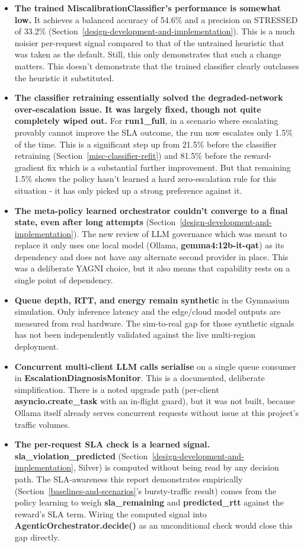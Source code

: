 \begin{itemize}
\item \textbf{The trained MiscalibrationClassifier's performance is somewhat
low.} It achieves a balanced accuracy of 54.6\% and a precision on
STRESSED of 33.2\% (Section~\ref{design-development-and-implementation}).
This is a much noisier per-request signal compared to that of the
untrained heuristic that was taken as the default. Still, this only
demonstrates that such a change matters. This doesn't demonstrate that
the trained classifier clearly outclasses the heuristic it
substituted.
\item \textbf{The classifier retraining essentially solved the
degraded-network over-escalation issue. It was largely fixed, though
not quite completely wiped out.} For \textbf{run1\_full}, in a
scenario where escalating provably cannot improve the SLA outcome,
the run now escalates only 1.5\% of the time. This is a significant
step up from 21.5\% before the classifier retraining
(Section~\ref{misc-classifier-refit}) and 81.5\% before the
reward-gradient fix which is a substantial further improvement. But that
remaining 1.5\% shows the policy hasn't learned a hard zero-escalation
rule for this situation - it has only picked up a strong preference
against it.
\item \textbf{The meta-policy learned orchestrator couldn't converge
to a final state, even after long attempts}
(Section~\ref{design-development-and-implementation}). The new review
of LLM governance which was meant to replace it only uses one local
model (Ollama, \textbf{gemma4:12b-it-qat}) as its dependency and does
not have any alternate second provider in place. This was a
deliberate YAGNI choice, but it also means that capability rests on a
single point of dependency.
\item \textbf{Queue depth, RTT, and energy remain synthetic} in the
Gymnasium simulation. Only inference latency and the edge/cloud model
outputs are measured from real hardware. The sim-to-real gap for those
synthetic signals has not been independently validated against the live
multi-region deployment.
\item \textbf{Concurrent multi-client LLM calls serialise} on a single
queue consumer in \textbf{EscalationDiagnosisMonitor}. This is a
documented, deliberate simplification. There is a
noted upgrade path (per-client \textbf{asyncio.create\_task} with an
in-flight guard), but it was not built, because Ollama itself already
serves concurrent requests without issue at this project's traffic
volumes.
\item \textbf{The per-request SLA check is a learned signal.} \textbf{sla\_violation\_predicted} (Section~\ref{design-development-and-implementation}, Silver) is
computed without being read by any decision path. The SLA-awareness this
report demonstrates empirically (Section~\ref{baselines-and-scenarios}'s bursty-traffic result)
comes from the policy learning to weigh \textbf{sla\_remaining} and
\textbf{predicted\_rtt} against the reward's SLA term. Wiring the computed signal into
\textbf{AgenticOrchestrator.decide()} as an unconditional check would
close this gap directly.
\end{itemize}
